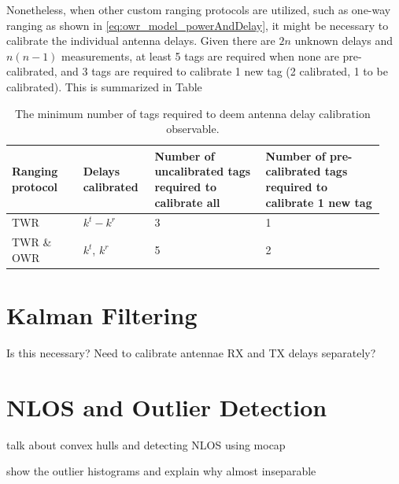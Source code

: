 \documentclass{decar-wsd}    %
\begin{document}
Nonetheless, when other custom ranging protocols are utilized, such as one-way ranging as shown in \eqref{eq:owr_model_powerAndDelay}, it might be necessary to calibrate the individual antenna delays. Given there are $2n$ unknown delays and $n(n-1)$ measurements, at least 5 tags are required when none are pre-calibrated, and 3 tags are required to calibrate 1 new tag (2 calibrated, 1 to be calibrated). This is summarized in Table

\begin{table}[h!]
    \begin{center}
      \caption{The minimum number of tags required to deem antenna delay calibration observable.}
      \label{tab:delays}
      \begin{tabular}{p{0.18\linewidth}|p{0.18\linewidth}|p{0.28\linewidth}|p{0.3\linewidth}}
        \textbf{Ranging protocol} & \textbf{Delays calibrated} & \textbf{Number of uncalibrated tags required to calibrate all} & \textbf{Number of pre-calibrated tags required to calibrate 1 new tag}\\
        \hline
        TWR & $k^t - k^r$ & 3 & 1\\
        TWR \& OWR & $k^t$, $k^r$ & 5 & 2\\
      \end{tabular}
    \end{center}
  \end{table}



\clearpage
\section{Kalman Filtering}

Is this necessary? Need to calibrate antennae RX and TX delays separately?

\section{NLOS and Outlier Detection}

talk about convex hulls and detecting NLOS using mocap

show the outlier histograms and explain why almost inseparable

\clearpage


% 
% 
%  

\end{document}
